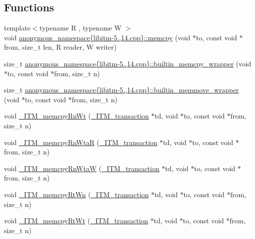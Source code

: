 \subsection*{Functions}
\begin{DoxyCompactItemize}
\item 
{\footnotesize template$<$typename R , typename W $>$ }\\void \hyperlink{namespaceanonymous__namespace_02libitm-5_813_0014_8cpp_03_a8b7be7cf3afef27c0623b844ce9116d8}{anonymous\-\_\-namespace\{libitm-\/5.,14.\-cpp\}\-::memcpy} (void $\ast$to, const void $\ast$from, size\-\_\-t len, R reader, W writer)
\item 
size\-\_\-t \hyperlink{namespaceanonymous__namespace_02libitm-5_813_0014_8cpp_03_a8dd7dae76248648e1534f566e0af169b}{anonymous\-\_\-namespace\{libitm-\/5.,14.\-cpp\}\-::builtin\-\_\-memcpy\-\_\-wrapper} (void $\ast$to, const void $\ast$from, size\-\_\-t n)
\item 
size\-\_\-t \hyperlink{namespaceanonymous__namespace_02libitm-5_813_0014_8cpp_03_a721a39277089e6abf82f33aa6d022585}{anonymous\-\_\-namespace\{libitm-\/5.,14.\-cpp\}\-::builtin\-\_\-memmove\-\_\-wrapper} (void $\ast$to, const void $\ast$from, size\-\_\-t n)
\item 
void \hyperlink{libitm-5_813_0014_8cpp_a2cb2b95c71020f45d0a014edc3741b67}{\-\_\-\-I\-T\-M\-\_\-memcpy\-Rn\-Wt} (\hyperlink{libitm_8h_a65d3a93d285fdbde408558d6b431abc8}{\-\_\-\-I\-T\-M\-\_\-transaction} $\ast$td, void $\ast$to, const void $\ast$from, size\-\_\-t n)
\item 
void \hyperlink{libitm-5_813_0014_8cpp_a79c79376d490c451bce9d50fe9ef568a}{\-\_\-\-I\-T\-M\-\_\-memcpy\-Rn\-Wta\-R} (\hyperlink{libitm_8h_a65d3a93d285fdbde408558d6b431abc8}{\-\_\-\-I\-T\-M\-\_\-transaction} $\ast$td, void $\ast$to, const void $\ast$from, size\-\_\-t n)
\item 
void \hyperlink{libitm-5_813_0014_8cpp_a39bf8783d370778793db84e3c105294a}{\-\_\-\-I\-T\-M\-\_\-memcpy\-Rn\-Wta\-W} (\hyperlink{libitm_8h_a65d3a93d285fdbde408558d6b431abc8}{\-\_\-\-I\-T\-M\-\_\-transaction} $\ast$td, void $\ast$to, const void $\ast$from, size\-\_\-t n)
\item 
void \hyperlink{libitm-5_813_0014_8cpp_a7a812c0eb28e3a03762bd9fe03fbc347}{\-\_\-\-I\-T\-M\-\_\-memcpy\-Rt\-Wn} (\hyperlink{libitm_8h_a65d3a93d285fdbde408558d6b431abc8}{\-\_\-\-I\-T\-M\-\_\-transaction} $\ast$td, void $\ast$to, const void $\ast$from, size\-\_\-t n)
\item 
void \hyperlink{libitm-5_813_0014_8cpp_a1558ad32aecd43142de0541f6a203f62}{\-\_\-\-I\-T\-M\-\_\-memcpy\-Rt\-Wt} (\hyperlink{libitm_8h_a65d3a93d285fdbde408558d6b431abc8}{\-\_\-\-I\-T\-M\-\_\-transaction} $\ast$td, void $\ast$to, const void $\ast$from, size\-\_\-t n)

\end{DoxyCompactItemize}
